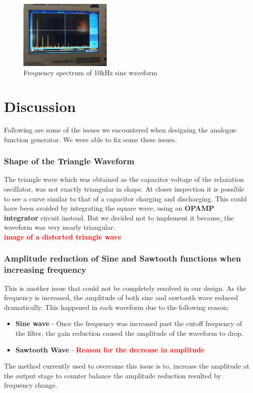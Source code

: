 \documentclass[11pt]{article}
\begin{document}
\begin{multicols}{2}
\begin{figure}[H]
    \centering
    \includegraphics[width=0.4\textwidth]{Sine_FFT_10kHz.jpeg}
    \caption{Frequency spectrum of 10kHz sine waveform}
    \label{fig:mesh7}
\end{figure}

\section{Discussion}

Following are some of the issues we encountered when designing the analogue function generator. We were able to fix some these issues.

\subsubsection*{Shape of the Triangle Waveform}
The triangle wave which was obtained as the capacitor voltage of the relaxation oscillator, was not exactly triangular in shape. At closer inspection it is possible to see a curve similar to that of a capacitor charging and discharging. This could have been avoided by integrating the square wave, using an \textbf{OPAMP integrator} circuit instead. But we decided not to implement it because, the waveform was very nearly triangular. 
\\
\textbf{\textcolor{red}{image of a distorted triangle wave}}

\subsubsection*{Amplitude reduction of Sine and Sawtooth functions when increasing frequency}

This is another issue that could not be completely resolved in our design. As the frequency is increased, the amplitude of both sine and sawtooth wave reduced dramatically. This happened in each waveform due to the following reason;
\begin{itemize}
    \item \textbf{Sine wave} - Once the frequency was increased past the cutoff frequency of the filter, the gain reduction caused the amplitude of the waveform to drop. 
    \item \textbf{Sawtooth Wave} - \textbf{\textcolor{red}{Reason for the decrease in amplitude}}
\end{itemize}

The method currently used to overcome this issue is to, increase the amplitude at the output stage to counter balance the amplitude reduction resulted by frequency change.

\end{multicols}
\end{document}
